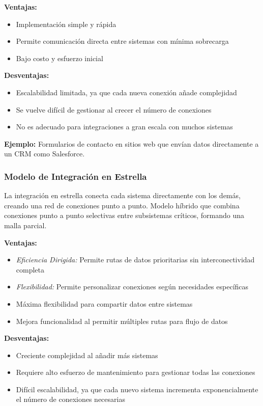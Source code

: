 \documentclass[12pt]{book}
\begin{document}
\textbf{Ventajas:}
\begin{itemize}
\item Implementación simple y rápida
\item Permite comunicación directa entre sistemas con mínima sobrecarga
\item Bajo costo y esfuerzo inicial
\end{itemize}

\textbf{Desventajas:}
\begin{itemize}
\item Escalabilidad limitada, ya que cada nueva conexión añade complejidad
\item Se vuelve difícil de gestionar al crecer el número de conexiones
\item No es adecuado para integraciones a gran escala con muchos sistemas
\end{itemize}

\textbf{Ejemplo:} Formularios de contacto en sitios web que envían datos directamente a un CRM como Salesforce.

\subsubsection{Modelo de Integración en Estrella}
La integración en estrella conecta cada sistema directamente con los demás, creando una red de conexiones punto a punto. Modelo híbrido que combina conexiones punto a punto selectivas entre subsistemas críticos, formando una malla parcial.

\textbf{Ventajas:}
\begin{itemize}
\item \textit{Eficiencia Dirigida:} Permite rutas de datos prioritarias sin interconectividad completa
\item \textit{Flexibilidad:} Permite personalizar conexiones según necesidades específicas
\item Máxima flexibilidad para compartir datos entre sistemas
\item Mejora funcionalidad al permitir múltiples rutas para flujo de datos
\end{itemize}

\textbf{Desventajas:}
\begin{itemize}
\item Creciente complejidad al añadir más sistemas
\item Requiere alto esfuerzo de mantenimiento para gestionar todas las conexiones
\item Difícil escalabilidad, ya que cada nuevo sistema incrementa exponencialmente el número de conexiones necesarias
\end{itemize}
\end{document}
